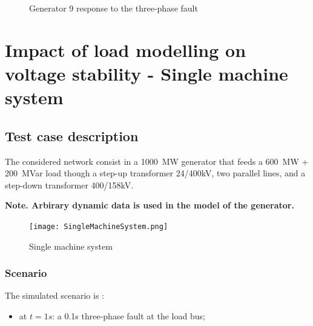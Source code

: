 \documentclass[a4paper, 12pt]{report}
\begin{document}
\begin{figure}[H]
\caption{Generator 9 response to the three-phase fault}
\end{figure}

\chapter{Impact of load modelling on voltage stability - Single machine system}

\section{Test case description}

The considered network consist in a 1000~MW generator that feeds a 600~MW + 200~MVar load though a step-up transformer 24/400kV, two parallel lines, and a step-down transformer 400/158kV.

\textbf{Note. Arbirary dynamic data is used in the model of the generator.}

\begin{figure}[H]
  \texttt{[image: SingleMachineSystem.png]}
  \caption{Single machine system}
\end{figure}

\subsection{Scenario}
The simulated scenario is :
\begin{itemize}
\item at $t=1s$: a 0.1s three-phase fault at the load bus;
\end{itemize}
\end{document}
